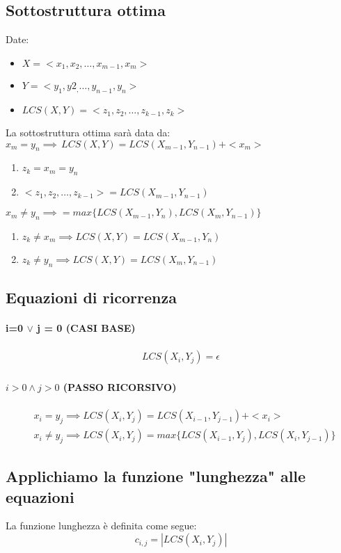 \subsection{Sottostruttura ottima}
Date:
\begin{itemize}
    \item $X=<x_1, x_2, \dots, x_{m-1}, x_m>$
    \item $Y=<y_1, y2_, \dots, y_{n-1}, y_n>$ 
    \item $LCS(X, Y) = <z_1, z_2, \dots, z_{k-1}, z_k>$
\end{itemize}
La sottostruttura ottima sarà data da:\\
$x_m = y_n \implies \, LCS(X,Y) = LCS(X_{m-1},Y_{n-1})+<x_m>$
\begin{enumerate}
    \item $z_k = x_m = y_n$
    \item $<z_1, z_2, \dots, z_{k-1}> = LCS(X_{m-1}, Y_{n-1})$
\end{enumerate}
$x_m \neq y_n \implies = max\{LCS(X_{m-1}, Y_n), LCS(X_m, Y_{n-1})\}$
\begin{enumerate}
    \item $z_k \neq x_m \implies LCS(X,Y)=LCS(X_{m-1},Y_n)$
    \item $z_k \neq y_n \implies LCS(X,Y)=LCS(X_m, Y_{n-1})$
\end{enumerate}
\subsection{Equazioni di ricorrenza}
\paragraph*{i=0 $\vee$ j = 0 (CASI BASE)}
\begin{align*}
    LCS(X_i, Y_j) = \epsilon
\end{align*}
\paragraph*{$i > 0 \wedge j>0$ (PASSO RICORSIVO)}
\begin{align*}
    &x_i = y_j \implies LCS(X_i, Y_j) = LCS(X_{i-1}, Y_{j-1}) + <x_i>\\
    &x_i \neq y_j \implies LCS(X_i, Y_j) = max\{LCS(X_{i-1}, Y_j), LCS(X_i, Y_{j-1})\}
\end{align*}
\subsection*{Applichiamo la funzione "lunghezza" alle equazioni}
La funzione lunghezza è definita come segue:
\[c_{i,j} = |LCS(X_i, Y_j)|\]
